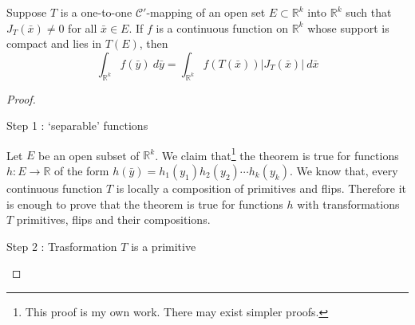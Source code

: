 \begin{theorem}
	Suppose $T$ is a one-to-one $\mathscr{C}'$-mapping of an open set $E \subset \mathbb{R}^k$ into $\mathbb{R}^k$ such that $J_T(\bar{x}) \ne 0$ for all $\bar{x} \in E$.
	If $f$ is a continuous function on $\mathbb{R}^k$ whose support is compact and lies in $T(E)$, then
	\begin{equation}
		\int_{\mathbb{R}^k} f(\bar{y})\ d\bar{y} = \int_{\mathbb{R}^k} f(T(\bar{x}))|J_T(\bar{x})|\ d\bar{x}
	\end{equation}
\end{theorem}
\begin{proof}
	\begin{commentary}
		Step 1 : `separable' functions
	\end{commentary}

	Let $E$ be an open subset of $\mathbb{R}^k$.
	We claim that\footnote{This proof is my own work. There may exist simpler proofs.}
	the theorem is true for functions $h : E \to \mathbb{R}$ of the form $h(\bar{y}) = h_1(y_1)h_2(y_2)\cdots h_k(y_k)$.
	We know that, every continuous function $T$ is locally a composition of primitives and flips.
	Therefore it is enough to prove that the theorem is true for functions $h$ with transformations $T$ primitives, flips and their compositions.\\
	\begin{commentary}
		Step 2 : Trasformation $T$ is a primitive
	\end{commentary}


\end{proof}
